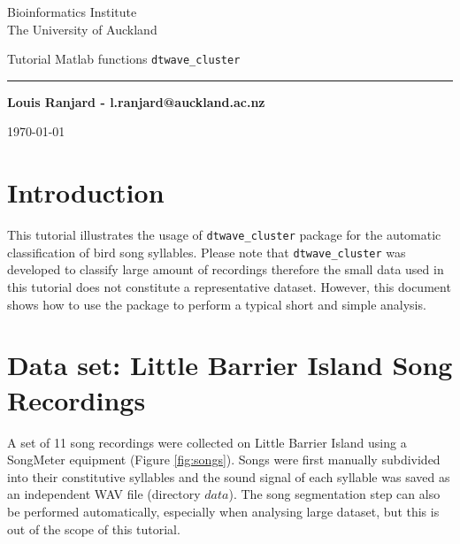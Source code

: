 \documentclass[a4paper]{article}
\begin{document}
\thispagestyle{empty}
\begin{minipage}{0.6\linewidth}
\begin{large}
Bioinformatics Institute\\
The University of Auckland\\
\end{large}
\end{minipage}


\begin{center} 
\vspace{270 pt}
\begin{Huge}
Tutorial Matlab functions \texttt{dtwave\_cluster}\\
\vspace{2pt}
\hrule
\end{Huge}
\end{center}
\begin{flushright}
\begin{Large}
\textbf{Louis Ranjard - l.ranjard@auckland.ac.nz}\\
\end{Large}
\end{flushright}
\vspace{250pt}
\begin{center}
\today
\end{center}
\vspace{35pt}
\newpage


\section*{Introduction}
This tutorial illustrates the usage of \texttt{dtwave\_cluster} package for the automatic classification of bird song syllables.
Please note that \texttt{dtwave\_cluster} was developed to classify large amount of recordings \cite{ranjard} therefore the small data used in this tutorial does not constitute a representative dataset.
However, this document shows how to use the package to perform a typical short and simple analysis.

\setlength\abovecaptionskip{-12pt}
\section{Data set: Little Barrier Island Song Recordings}
A set of 11 song recordings were collected on Little Barrier Island using a SongMeter equipment (Figure \ref{fig:songs}).
Songs were first manually subdivided into their constitutive syllables and the sound signal of each syllable was saved as an independent WAV file (directory \(data\)).
The song segmentation step can also be performed automatically, especially when analysing large dataset, but this is out of the scope of this tutorial.
\end{document}
